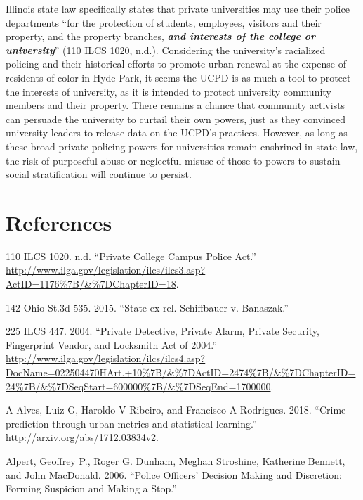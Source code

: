 \documentclass{ucetd}
\begin{document}
Illinois state law specifically states that private universities may use
their police departments ``for the protection of students, employees,
visitors and their property, and the property branches,
\textbf{\emph{and interests of the college or university}}'' (110 ILCS
1020, n.d.). Considering the university's racialized policing and their
historical efforts to promote urban renewal at the expense of residents
of color in Hyde Park, it seems the UCPD is as much a tool to protect
the interests of university, as it is intended to protect university
community members and their property. There remains a chance that
community activists can persuade the university to curtail their own
powers, just as they convinced university leaders to release data on the
UCPD's practices. However, as long as these broad private policing
powers for universities remain enshrined in state law, the risk of
purposeful abuse or neglectful misuse of those to powers to sustain
social stratification will continue to persist.

\hypertarget{references}{%
\chapter{References}\label{references}}

\setlength{\parindent}{-0.2in}
\setlength{\leftskip}{0.2in}
\setlength{\parskip}{8pt}

\noindent

\hypertarget{refs}{}
\leavevmode\hypertarget{ref-110ILCS1020}{}%
110 ILCS 1020. n.d. ``Private College Campus Police Act.''
\url{http://www.ilga.gov/legislation/ilcs/ilcs3.asp?ActID=1176\%7B/\&\%7DChapterID=18}.

\leavevmode\hypertarget{ref-142OhioSt.3d5352015}{}%
142 Ohio St.3d 535. 2015. ``State ex rel. Schiffbauer v. Banaszak.''

\leavevmode\hypertarget{ref-225ILCS4472004}{}%
225 ILCS 447. 2004. ``Private Detective, Private Alarm, Private
Security, Fingerprint Vendor, and Locksmith Act of 2004.''
\url{http://www.ilga.gov/legislation/ilcs/ilcs4.asp?DocName=022504470HArt.+10\%7B/\&\%7DActID=2474\%7B/\&\%7DChapterID=24\%7B/\&\%7DSeqStart=600000\%7B/\&\%7DSeqEnd=1700000}.

\leavevmode\hypertarget{ref-AAlves2018}{}%
A Alves, Luiz G, Haroldo V Ribeiro, and Francisco A Rodrigues. 2018.
``Crime prediction through urban metrics and statistical learning.''
\url{http://arxiv.org/abs/1712.03834v2}.

\leavevmode\hypertarget{ref-Alpert2006}{}%
Alpert, Geoffrey P., Roger G. Dunham, Meghan Stroshine, Katherine
Bennett, and John MacDonald. 2006. ``Police Officers' Decision Making
and Discretion: Forming Suspicion and Making a Stop.''
\end{document}
